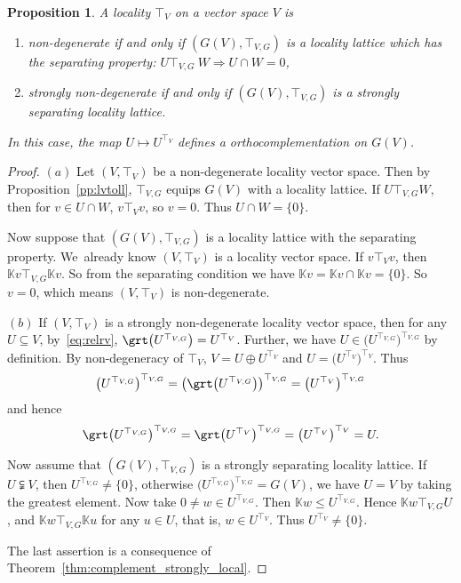 \documentclass[pdftex]{sigma}
\numberwithin{equation}{section}
\newtheorem{Proposition}[Theorem]{Proposition}
\newcommand{\K}{\mathbb{K}}
\newcommand{\loc}{locality\xspace}
\begin{document}
\begin {Proposition}
\label {prop:VGV2}
A locality $\top _V$ on a vector space $V$ is
\begin{enumerate}
\item %
non-degenerate if and only if $(G(V),\top_{V,G})$ is a \loc lattice which has the separating property:
$U \top_{V,G}\ W\Rightarrow U\cap W=0$,
\item %
strongly non-degenerate if and only if $(G(V),\top_{V,G})$ is a strongly separating \loc lattice.
\end{enumerate}
In this case, the map $U\mapsto U^{\top_V}$ defines a orthocomplementation on $G(V)$.
\end{Proposition}
	
\begin {proof}
$(a)$
Let $(V,\top_V)$ be a non-degenerate \loc vector space. Then by Proposition~\ref{pp:lvtoll}, $\top_{V,G}$ equips $G(V)$ with a \loc lattice. If $U\top_{V,G} W$, then for $v\in U\cap W$, $v\top _V v$, so $v=0.$ Thus $U \cap W =\{0\}$.

Now suppose that $(G(V), \top_{V,G})$ is a \loc lattice with the separating property. We~already know $(V, \top _V)$ is a locality vector space. If $v\top _V v$, then $\K v\top _{V,G} \K v$. So from the separating condition we have $\K v=\K v\cap \K v=\{0\}$. So $v=0$, which means $(V, \top_V)$ is non-degenerate.


$(b)$
If $(V, \top _V )$ is a strongly non-degenerate locality vector space, then
for any $U\subseteq V$, by~\eqref{eq:relrv}, $\grt\big(U^{\top _{V,G}}\big)=U^{\top _V}$.
Further, we have $U\in \big(U^{\top _{V,G}}\big)^{\top _{V,G}}$ by definition. By non-degeneracy of $\top _V$, $V=U\oplus U^{\top _V}$ and $U=\big(U^{\top _V}\big)^{\top _V}$. Thus
\begin{gather*}
\big(U^{\top _{V,G}}\big)^{\top _{V,G}}=\big(\grt\big(U^{\top _{V,G}}\big)\big)^{\top _{V,G}}=\big(U^{\top _V}\big)^{\top _{V,G}}
\end{gather*}
and hence
\begin{gather*}
\grt \big(U^{\top _{V,G}}\big)^{\top _{V,G}}=\grt \big(U^{\top _V}\big)^{\top _{V,G}}=\big(U^{\top _V}\big)^{\top _V}=U.
\end{gather*}

Now assume that $(G(V), \top _{V,G})$ is a strongly separating \loc lattice. If $U\subsetneqq V$, then $U^{\top _{V,G}} \not =\{0\}$, otherwise $\big(U^{\top _{V,G}}\big)^{\top _{V,G}}=G(V)$, we have $U=V$ by taking the greatest element. Now take $0\neq w\in U^{\top _{V,G}}$. Then $\K w\leq U^{\top _{V,G}}$. Hence $\K w \top _{V,G} U$, and $\K w \top _{V,G} \K u$ for any $u\in U$, that is, $w\in U^{\top _V}$. Thus $U^{\top_V}\neq \{0\}$.

The last assertion is a consequence of Theorem~\ref{thm:complement_strongly_local}.
\end{proof}
\end{document}
